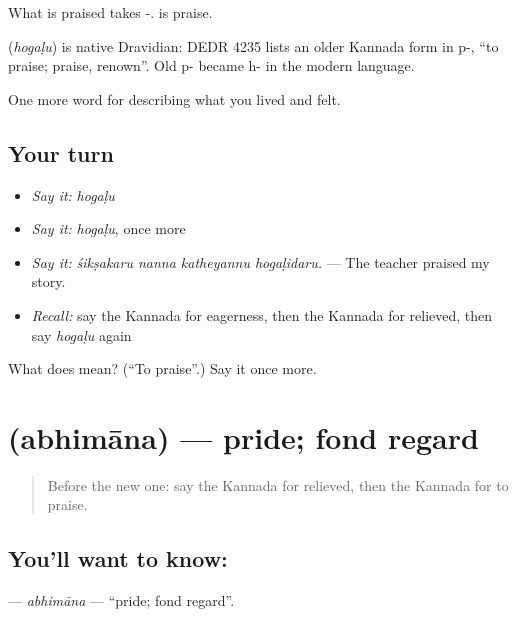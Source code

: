 What is praised takes -.  is praise.

\begin{cousinweb}
\textbf{} (\emph{hogaḷu}) is native Dravidian: DEDR 4235 lists an older Kannada form in p-, \textquotedblleft{}to praise; praise, renown\textquotedblright{}. Old p- became h- in the modern language.
\end{cousinweb}

\begin{grammarlens}[title={What you've built}]
One more word for describing what you lived and felt.
\end{grammarlens}

\subsection*{Your turn}
\begin{itemize}
\raggedright
  \item \emph{Say it:} \emph{hogaḷu}
  \item \emph{Say it:} \emph{hogaḷu}, once more
  \item \emph{Say it:} \emph{śikṣakaru nanna katheyannu hogaḷidaru.} — The teacher praised my story.
  \item \emph{Recall:} say the Kannada for eagerness, then the Kannada for relieved, then say \emph{hogaḷu} again
\end{itemize}

\begin{tcolorbox}[breakable,colback=teal!4,colframe=teal!35!black,title={Before you move on}]
What does  mean? (\textquotedblleft{}To praise\textquotedblright{}.) Say it once more.
\end{tcolorbox}
\section[\texorpdfstring{\kn{ಅಭಿಮಾನ} (abhimāna)}{ಅಭಿಮಾನ (abhimāna)}]{ (abhimāna) — pride; fond regard}

\label{lesson:KA-C497-abhimana}



\begin{quote}
Before the new one: say the Kannada for relieved, then the Kannada for to praise.
\end{quote}

\subsection*{You'll want to know: }
\textbf{} — \emph{abhimāna} — \textquotedblleft{}pride; fond regard\textquotedblright{}.

